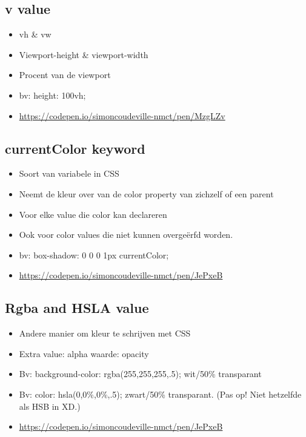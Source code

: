 \documentclass{article}
\begin{document}
\subsection{v value}

\begin{itemize}
    \item vh \& vw
    \item Viewport-height \& viewport-width
    \item Procent van de viewport
    \item bv: height: 100vh;
    \item \url{https://codepen.io/simoncoudeville-nmct/pen/MzgLZv}
\end{itemize}

\subsection{currentColor keyword}

\begin{itemize}
    \item Soort van variabele in CSS
    \item Neemt de kleur over van de color property van zichzelf of een parent
    \item Voor elke value die color kan declareren
    \item Ook voor color values die niet kunnen overgeërfd worden.
    \item bv: box-shadow: 0 0 0 1px currentColor;
    \item \url{https://codepen.io/simoncoudeville-nmct/pen/JePxeB}
\end{itemize}

\subsection{Rgba and HSLA value}

\begin{itemize}
    \item Andere manier om kleur te schrijven met CSS
    \item Extra value: alpha waarde: opacity
    \item Bv: background-color: rgba(255,255,255,.5); wit/50\% transparant
    \item Bv: color: hsla(0,0\%,0\%,.5); zwart/50\% transparant. (Pas op! Niet hetzelfde als HSB in XD.)
    \item \url{https://codepen.io/simoncoudeville-nmct/pen/JePxeB}
\end{itemize}
\end{document}
